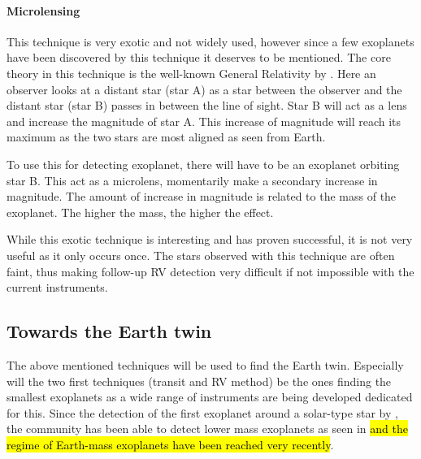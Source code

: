 \paragraph{Microlensing}

This technique is very exotic and not widely used, however since a few exoplanets have been
discovered by this technique it deserves to be mentioned. The core theory in this technique is the
well-known General Relativity by \citet{Einstein1916}. Here an observer looks at a distant star
(star A) as a star between the observer and the distant star (star B) passes in between the line of
sight. Star B will act as a lens and increase the magnitude of star A. This increase of magnitude
will reach its maximum as the two stars are most aligned as seen from Earth.

To use this for detecting exoplanet, there will have to be an exoplanet orbiting star B. This act as
a microlens, momentarily make a secondary increase in magnitude. The amount of increase in magnitude
is related to the mass of the exoplanet. The higher the mass, the higher the effect.

While this exotic technique is interesting and has proven successful, it is not very useful as it
only occurs once. The stars observed with this technique are often faint, thus making follow-up RV
detection very difficult if not impossible with the current instruments.


\subsection{Towards the Earth twin}

The above mentioned techniques will be used to find the Earth twin. Especially will the two first
techniques (transit and RV method) be the ones finding the smallest exoplanets as a wide range of
instruments are being developed dedicated for this. Since the detection of the first exoplanet around a solar-type star by \citet{Mayor1995}, the
community has been able to detect lower mass exoplanets as seen in  \hl{and
the regime of Earth-mass exoplanets have been reached very recently}.

